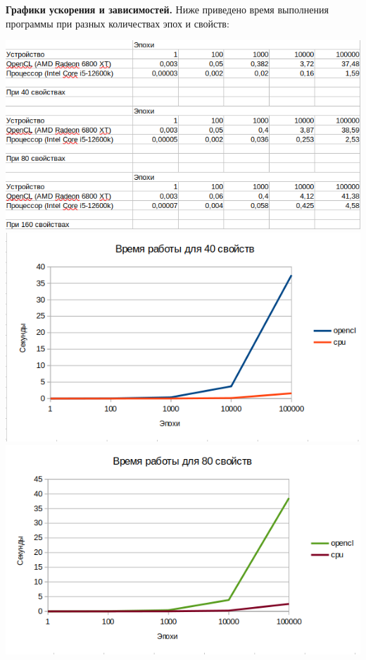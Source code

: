 \documentclass[a4paper,14pt]{extarticle}
\begin{document}
\textbf{Графики ускорения и зависимостей.}
Ниже приведено время выполнения программы при разных количествах эпох и свойств:\\
\begin{center}
    \includegraphics[width=140mm]{exp}\\
    \includegraphics[width=140mm]{exp_40}\\
    \includegraphics[width=140mm]{exp_80}\\

\end{center}
\end{document}
